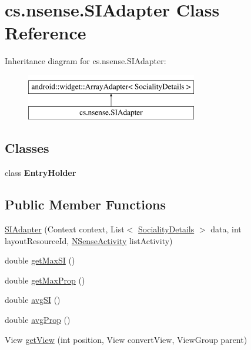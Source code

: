 \hypertarget{classcs_1_1nsense_1_1_s_i_adapter}{\section{cs.\-nsense.\-S\-I\-Adapter Class Reference}
\label{classcs_1_1nsense_1_1_s_i_adapter}
}
Inheritance diagram for cs.\-nsense.\-S\-I\-Adapter\-:\begin{figure}[H]
\begin{center}
\leavevmode
\includegraphics[height=2.000000cm]{classcs_1_1nsense_1_1_s_i_adapter}
\end{center}
\end{figure}
\subsection*{Classes}
\begin{DoxyCompactItemize}
\item 
class {\bfseries Entry\-Holder}
\end{DoxyCompactItemize}
\subsection*{Public Member Functions}
\begin{DoxyCompactItemize}
\item 
\hyperlink{classcs_1_1nsense_1_1_s_i_adapter_a063299bea348241e5ae136e29fdaf70e}{S\-I\-Adapter} (Context context, List$<$ \hyperlink{classcs_1_1nsense_1_1inference_module_1_1_sociality_details}{Sociality\-Details} $>$ data, int layout\-Resource\-Id, \hyperlink{classcs_1_1nsense_1_1_n_sense_activity}{N\-Sense\-Activity} list\-Activity)
\item 
double \hyperlink{classcs_1_1nsense_1_1_s_i_adapter_a80e598eee806faab383c3a9777caf733}{get\-Max\-S\-I} ()
\item 
double \hyperlink{classcs_1_1nsense_1_1_s_i_adapter_a56f20101525a7309d4d6c959e4c96fbc}{get\-Max\-Prop} ()
\item 
double \hyperlink{classcs_1_1nsense_1_1_s_i_adapter_ac2836c61c2bf41c9822f5322479e5361}{avg\-S\-I} ()
\item 
double \hyperlink{classcs_1_1nsense_1_1_s_i_adapter_a044de8f13dba00fd78d0ff608f099619}{avg\-Prop} ()
\item 
View \hyperlink{classcs_1_1nsense_1_1_s_i_adapter_af9a9bd163c51e8aea31fa3519e516244}{get\-View} (int position, View convert\-View, View\-Group parent)
\end{DoxyCompactItemize}
